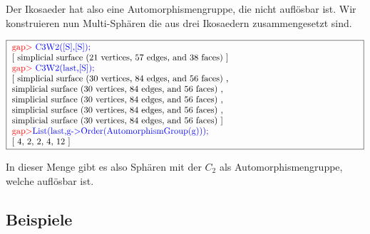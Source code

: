 \documentclass[12pt,titlepage,twoside,cleardoublepage]{article}
\theoremstyle{nummermitklammern}
\numberwithin{equation}{section}
\begin{document}
Der Ikosaeder hat also eine Automorphismengruppe, die nicht auflösbar ist. Wir konstruieren nun Multi-Sphären die aus drei Ikosaedern zusammengesetzt sind.
\begin{center}
$\fbox{
\parbox{14cm}{
\textcolor{red}{gap$>$} \textcolor{blue}{C3W2([S],[S]);}\newline
[ simplicial surface (21 vertices, 57 edges, and 38 faces)
 ]\newline
\textcolor{red}{gap$>$} \textcolor{blue}{C3W2(last,[S]);}\newline
[ simplicial surface (30 vertices, 84 edges, and 56 faces)
    ,\newline simplicial surface (30 vertices, 84 edges, and 56 faces)
    , \newline simplicial surface (30 vertices, 84 edges, and 56 faces)
    ,\newline simplicial surface (30 vertices, 84 edges, and 56 faces)
    ,\newline
  simplicial surface (30 vertices, 84 edges, and 56 faces)
 ]\newline
\textcolor{red}{gap$>$}\textcolor{blue}{ List(last,g-$>$Order(AutomorphismGroup(g)));}\newline
[ 4, 2, 2, 4, 12 ]
}}$
\end{center}
In dieser Menge gibt es also Sphären mit der $C_2$ als Automorphismengruppe, welche auflösbar ist.
\subsection{Beispiele}
\end{document}

